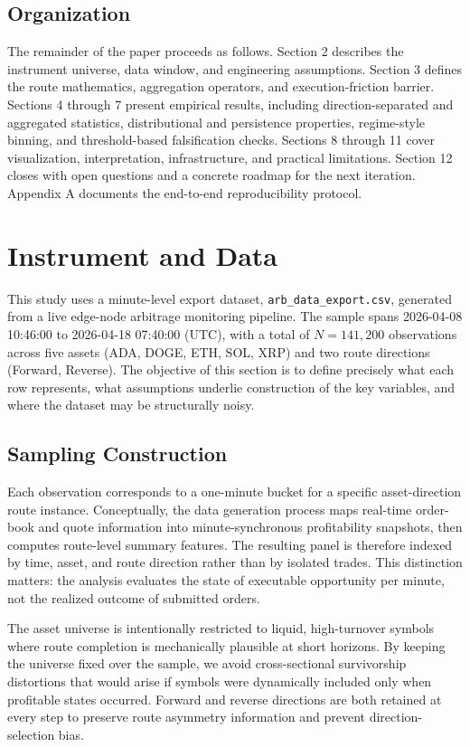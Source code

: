 \documentclass[11pt,a4paper]{article}
\begin{document}
\subsection{Organization}
The remainder of the paper proceeds as follows. Section 2 describes the instrument universe, data window, and engineering assumptions. Section 3 defines the route mathematics, aggregation operators, and execution-friction barrier. Sections 4 through 7 present empirical results, including direction-separated and aggregated statistics, distributional and persistence properties, regime-style binning, and threshold-based falsification checks. Sections 8 through 11 cover visualization, interpretation, infrastructure, and practical limitations. Section 12 closes with open questions and a concrete roadmap for the next iteration. Appendix A documents the end-to-end reproducibility protocol.

\section{Instrument and Data}
This study uses a minute-level export dataset, \texttt{arb\_data\_export.csv}, generated from a live edge-node arbitrage monitoring pipeline. The sample spans 2026-04-08 10:46:00 to 2026-04-18 07:40:00 (UTC), with a total of $N=141{,}200$ observations across five assets (ADA, DOGE, ETH, SOL, XRP) and two route directions (Forward, Reverse). The objective of this section is to define precisely what each row represents, what assumptions underlie construction of the key variables, and where the dataset may be structurally noisy.

\subsection{Sampling Construction}
Each observation corresponds to a one-minute bucket for a specific asset-direction route instance. Conceptually, the data generation process maps real-time order-book and quote information into minute-synchronous profitability snapshots, then computes route-level summary features. The resulting panel is therefore indexed by time, asset, and route direction rather than by isolated trades. This distinction matters: the analysis evaluates the state of executable opportunity per minute, not the realized outcome of submitted orders.

The asset universe is intentionally restricted to liquid, high-turnover symbols where route completion is mechanically plausible at short horizons. By keeping the universe fixed over the sample, we avoid cross-sectional survivorship distortions that would arise if symbols were dynamically included only when profitable states occurred. Forward and reverse directions are both retained at every step to preserve route asymmetry information and prevent direction-selection bias.
\end{document}
